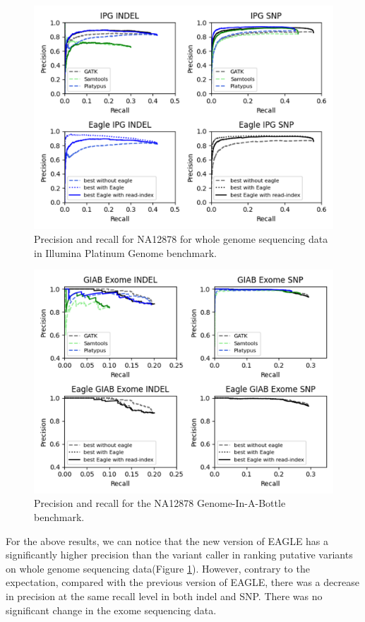 \documentclass[PhD]{PHlab-thesis}
\begin{document}
\begin{figure}[h!]
	\centering
	\includegraphics[scale=0.45]{figures/IPG result.png}
	\caption{Precision and recall for NA12878 for whole genome sequencing data in Illumina Platinum Genome benchmark.}
	\label{fig:The result of IPG dataset}
\end{figure}

\begin{figure}[h!]
	\centering
	\includegraphics[scale=0.45]{figures/GIAB result.png}
	\caption{Precision and recall for the NA12878 Genome-In-A-Bottle benchmark.}
	\label{fig:The result of GIAB dataset}
\end{figure}

For the above results, we can notice that the new version of EAGLE has a significantly higher precision than the variant caller in ranking putative variants on whole genome sequencing data(Figure \ref{fig:The result of IPG dataset}). However, contrary to the expectation, compared with the previous version of EAGLE, there was a decrease in precision at the same recall level in both indel and SNP.  There was no significant change in the exome sequencing data.
\end{document}
